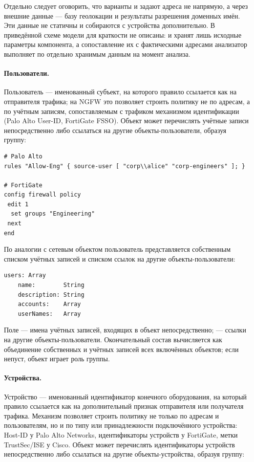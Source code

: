Отдельно следует оговорить, что варианты  и  задают адреса не напрямую, а через внешние данные --- базу геолокации и результаты разрешения доменных имён. Эти данные не статичны и собираются с устройства дополнительно. В приведённой схеме модели для краткости не описаны:  и  хранят лишь исходные параметры компонента, а сопоставление их с фактическими адресами анализатор выполняет по отдельно хранимым данным на момент анализа.

\paragraph{Пользователи.} Пользователь --- именованный субъект, на которого правило ссылается как на отправителя трафика; на NGFW это позволяет строить политику не по адресам, а по учётным записям, сопоставляемым с трафиком механизмом идентификации (Palo Alto User-ID, FortiGate FSSO). Объект может перечислять учётные записи непосредственно либо ссылаться на другие объекты-пользователи, образуя группу:

\begin{verbatim}
# Palo Alto
rules "Allow-Eng" { source-user [ "corp\\alice" "corp-engineers" ]; }

# FortiGate
config firewall policy
 edit 1
  set groups "Engineering"
 next
end
\end{verbatim}

По аналогии с сетевым объектом пользователь представляется собственным списком учётных записей и списком ссылок на другие объекты-пользователи:

\begin{lstlisting}[style=schemastyle]
users: Array
    name:        String
    description: String
    accounts:    Array
    userNames:   Array
\end{lstlisting}

Поле  --- имена учётных записей, входящих в объект непосредственно;  --- ссылки на другие объекты-пользователи. Окончательный состав вычисляется как объединение собственных  и учётных записей всех включённых объектов; если  непуст, объект играет роль группы.

\paragraph{Устройства.} Устройство --- именованный идентификатор конечного оборудования, на который правило ссылается как на дополнительный признак отправителя или получателя трафика. Механизм позволяет строить политику не только по адресам и пользователям, но и по типу или принадлежности подключённого устройства: Host-ID у Palo Alto Networks, идентификаторы устройств у FortiGate, метки TrustSec/ISE у Cisco. Объект может перечислять идентификаторы устройств непосредственно либо ссылаться на другие объекты-устройства, образуя группу:

